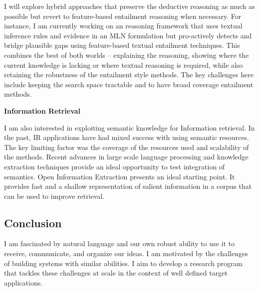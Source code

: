 \documentclass[a4paper,11pt,onecolumn]{article}
\begin{document}
I will explore hybrid approaches that preserve the deductive reasoning as much as possible but revert to feature-based entailment reasoning when necessary. For instance, I am currently working on an reasoning framework that uses textual inference rules and evidence in an MLN formulation but pro-actively detects and bridge plausible gaps using feature-based textual entailment techniques. This combines the best of both worlds -- explaining the reasoning, showing where the current knowledge is lacking or where textual reasoning is required, while also retaining the robustness of the entailment style methods. The key challenges here include keeping the search space tractable and to have broad coverage entailment methods. 


{\bf Information Retrieval}

I am also interested in exploiting semantic knowledge for Information retrieval. In the past, IR applications have had mixed success with using semantic resources. The key limiting factor was the coverage of the resources used and scalability of the methods. Recent advances in large scale language processing and knowledge extraction techniques provide an ideal opportunity to test integration of semantics. Open Information Extraction presents an ideal starting point. It provides fast and a shallow representation of salient information in a corpus that can be used to improve retrieval. 

\subsection*{Conclusion}
I am fascinated by natural language and our own robust ability to use it to receive, communicate, and organize our ideas. I am motivated by the challenges of building systems with similar abilities. I aim to develop a research program that tackles these challenges at scale in the context of well defined target applications. 

{\small


}
\end{document}
